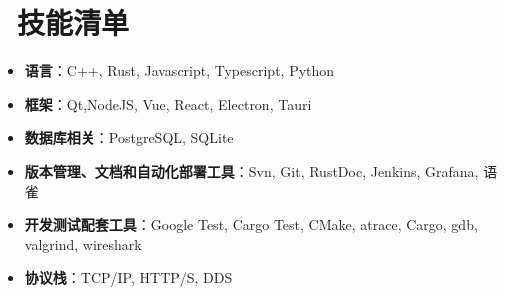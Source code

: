 \documentclass{resume}
\begin{document}

\section{\faCogs\ 技能清单}
\begin{itemize}[parsep=0.5ex]
    \item \textbf{语言}：C++, Rust, Javascript, Typescript, Python
    \item \textbf{框架}：Qt,NodeJS, Vue, React, Electron, Tauri
    \item \textbf{数据库相关}：PostgreSQL, SQLite
    \item \textbf{版本管理、文档和自动化部署工具}：Svn, Git, RustDoc, Jenkins, Grafana, 语雀
    \item \textbf{开发测试配套工具}：Google Test, Cargo Test, CMake, atrace, Cargo, gdb, valgrind, wireshark
    \item \textbf{协议栈}：TCP/IP, HTTP/S, DDS
\end{itemize}



%
%
\end{document}
